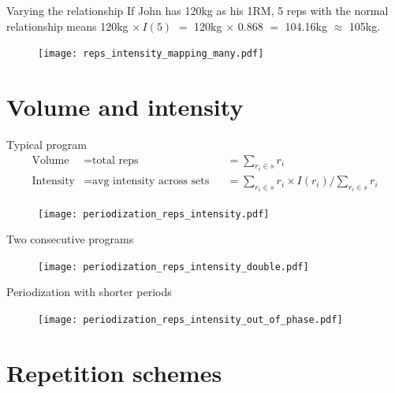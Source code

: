 \documentclass[11pt, aspectratio=149]{beamer}
\theoremstyle{plain}
\begin{document}
\begin{frame}[fragile, t]{Varying the relationship}
	\vfill
	If John has 120kg as his 1RM, 5 reps with the normal relationship means 120kg $\times \, I(5)$  $=$ 120kg $\times$ 0.868 $=$ 104.16kg $\approx$ 105kg.
	\vfill
	\begin{figure}
		\centering
		\texttt{[image: reps\_intensity\_mapping\_many.pdf]}
	\end{figure}
	\vfill
\end{frame}

\section{Volume and intensity}

\begin{frame}[fragile, t]{Typical program}
	\vspace*{-2em}
	\begin{align*}
		\text{Volume} &= \text{total reps} &&= \sum_{r_i \in s} r_i \\
		\text{Intensity} &= \text{avg intensity across sets} &&= \sum_{r_i \in s} r_i \times I(r_i) / \sum_{r_i \in s} r_i 
	\end{align*}
	\vspace*{-1em}
	\begin{figure}
		\centering
		\texttt{[image: periodization\_reps\_intensity.pdf]}
	\end{figure}
	\vfill
\end{frame}


\begin{frame}[fragile, t]{Two consecutive programs}
	\vfill
	\begin{figure}
		\centering
		\texttt{[image: periodization\_reps\_intensity\_double.pdf]}
	\end{figure}
	\vfill
\end{frame}

\begin{frame}[fragile, t]{Periodization with shorter periods}
	\vfill
	\begin{figure}
		\centering
		\texttt{[image: periodization\_reps\_intensity\_out\_of\_phase.pdf]}
	\end{figure}
	\vfill
\end{frame}


\section{Repetition schemes}
\end{document}
